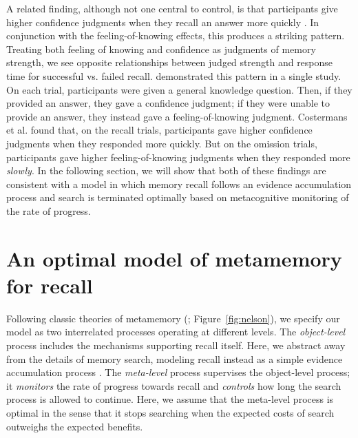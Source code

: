 A related finding, although not one central to control, is that participants give higher confidence judgments when they recall an answer more quickly \citepnelson{}. In conjunction with the feeling-of-knowing effects, this produces a striking pattern. Treating both feeling of knowing and confidence as judgments of memory strength, we see opposite relationships between judged strength and response time for successful vs. failed recall. \citet{costermans1992confidence} demonstrated this pattern in a single study. On each trial, participants were given a general knowledge question. Then, if they provided an answer, they gave a confidence judgment; if they were unable to provide an answer, they instead gave a feeling-of-knowing judgment. Costermans et al. found that, on the recall trials, participants gave higher confidence judgments when they responded more quickly. But on the omission trials, participants gave higher feeling-of-knowing judgments when they responded more \emph{slowly}. In the following section, we will show that both of these findings are consistent with a model in which memory recall follows an evidence accumulation process and search is terminated optimally based on metacognitive monitoring of the rate of progress.


\section{An optimal model of metamemory for recall}

Following classic theories of metamemory (\citealpnelson{}; Figure~\ref{fig:nelson}), we specify our model as two interrelated processes operating at different levels. The \emph{object-level} process includes the mechanisms supporting recall itself. Here, we abstract away from the details of memory search, modeling recall instead as a simple evidence accumulation process \citep{ratcliff2002estimating,sederberg2008context}. The \emph{meta-level} process supervises the object-level process; it \emph{monitors} the rate of progress towards recall and \emph{controls} how long the search process is allowed to continue. Here, we assume that the meta-level process is optimal in the sense that it stops searching when the expected costs of search outweighs the expected benefits.

